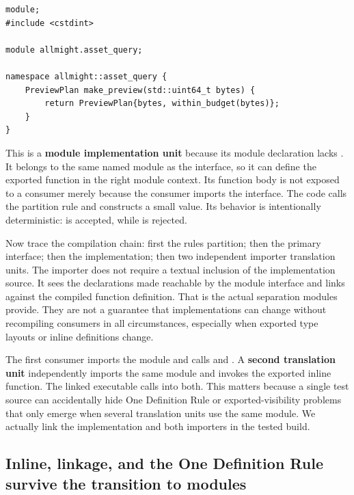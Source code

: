 \begin{verbatim}
module;
#include <cstdint>

module allmight.asset_query;

namespace allmight::asset_query {
    PreviewPlan make_preview(std::uint64_t bytes) {
        return PreviewPlan{bytes, within_budget(bytes)};
    }
}
\end{verbatim}

This is a \textbf{module implementation unit} because its module declaration lacks . It belongs to the same named module as the interface, so it can define the exported function in the right module context. Its function body is not exposed to a consumer merely because the consumer imports the interface. The code calls the partition rule and constructs a small value. Its behavior is intentionally deterministic:  is accepted, while  is rejected.

Now trace the compilation chain: first the rules partition; then the primary interface; then the implementation; then two independent importer translation units. The importer does not require a textual inclusion of the implementation source. It sees the declarations made reachable by the module interface and links against the compiled function definition. That is the actual separation modules provide. They are not a guarantee that implementations can change without recompiling consumers in all circumstances, especially when exported type layouts or inline definitions change.

The first consumer imports the module and calls  and . A \textbf{second translation unit} independently imports the same module and invokes the exported inline function. The linked executable calls into both. This matters because a single test source can accidentally hide One Definition Rule or exported-visibility problems that only emerge when several translation units use the same module. We actually link the implementation and both importers in the tested build.

\subsection{Inline, linkage, and the One Definition Rule survive the transition to modules}\label{05-engine-i-ch006-inline-linkage-and-the-one-definition-rule-survive-the-transition-to-modules}

